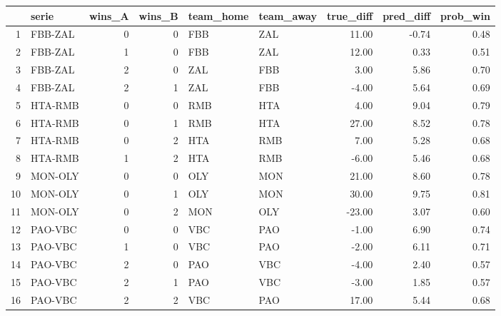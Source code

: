 \begin{table}[ht]
\centering
\begin{tabular}{rlrrllrrr}
  \hline
 & serie & wins\_A & wins\_B & team\_home & team\_away & true\_diff & pred\_diff & prob\_win \\ 
  \hline
1 & FBB-ZAL &   0 &   0 & FBB & ZAL & 11.00 & -0.74 & 0.48 \\ 
  2 & FBB-ZAL &   1 &   0 & FBB & ZAL & 12.00 & 0.33 & 0.51 \\ 
  3 & FBB-ZAL &   2 &   0 & ZAL & FBB & 3.00 & 5.86 & 0.70 \\ 
  4 & FBB-ZAL &   2 &   1 & ZAL & FBB & -4.00 & 5.64 & 0.69 \\ 
  5 & HTA-RMB &   0 &   0 & RMB & HTA & 4.00 & 9.04 & 0.79 \\ 
  6 & HTA-RMB &   0 &   1 & RMB & HTA & 27.00 & 8.52 & 0.78 \\ 
  7 & HTA-RMB &   0 &   2 & HTA & RMB & 7.00 & 5.28 & 0.68 \\ 
  8 & HTA-RMB &   1 &   2 & HTA & RMB & -6.00 & 5.46 & 0.68 \\ 
  9 & MON-OLY &   0 &   0 & OLY & MON & 21.00 & 8.60 & 0.78 \\ 
  10 & MON-OLY &   0 &   1 & OLY & MON & 30.00 & 9.75 & 0.81 \\ 
  11 & MON-OLY &   0 &   2 & MON & OLY & -23.00 & 3.07 & 0.60 \\ 
  12 & PAO-VBC &   0 &   0 & VBC & PAO & -1.00 & 6.90 & 0.74 \\ 
  13 & PAO-VBC &   1 &   0 & VBC & PAO & -2.00 & 6.11 & 0.71 \\ 
  14 & PAO-VBC &   2 &   0 & PAO & VBC & -4.00 & 2.40 & 0.57 \\ 
  15 & PAO-VBC &   2 &   1 & PAO & VBC & -3.00 & 1.85 & 0.57 \\ 
  16 & PAO-VBC &   2 &   2 & VBC & PAO & 17.00 & 5.44 & 0.68 \\ 
   \hline
\end{tabular}
\end{table}

